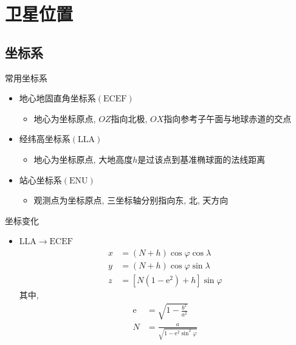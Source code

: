 \section{卫星位置}

\subsection{坐标系}
\begin{frame}{常用坐标系}
    \begin{itemize}[<+-| alert@+>]
        \item 地心地固直角坐标系$\left( \mathrm{ECEF} \right)$
        \begin{itemize}
            \item[] 地心为坐标原点, $OZ$指向北极, $OX$指向参考子午面与地球赤道的交点
        \end{itemize}
        \item 经纬高坐标系$\left( \mathrm{ LLA } \right)$
        \begin{itemize}
            \item[] 地心为坐标原点, 大地高度$h$是过该点到基准椭球面的法线距离
        \end{itemize}
        \item 站心坐标系$\left( \mathrm{ ENU } \right)$
        \begin{itemize}
            \item[] 观测点为坐标原点, 三坐标轴分别指向东, 北, 天方向
        \end{itemize}
    \end{itemize}
\end{frame}

\begin{frame}{坐标变化}
    \begin{itemize}
        \item $\mathrm{LLA} \rightarrow \mathrm{ECEF}$
        \begin{align*}
            x &= \left( N + h \right) \cos \varphi \cos \lambda \\
            y &= \left( N + h \right) \cos \varphi \sin \lambda \\
            z &= \left[ N \left( 1 - \mathrm e ^ 2 \right) + h \right] \sin \varphi
        \end{align*}
        其中,
        \begin{align*}
            \mathrm e &= \sqrt{ 1 - \frac{ b ^ 2 }{ a ^ 2 } } \\
            N &= \frac{ a }{ \sqrt{ 1 - \mathrm e ^ 2 \sin ^ 2 \varphi } }
        \end{align*}
    \end{itemize}
\end{frame}


